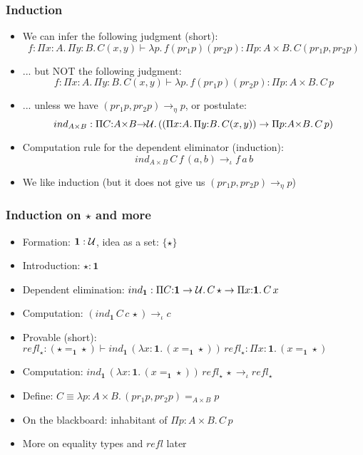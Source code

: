 \documentclass[handout]{beamer}
\newcommand{\depi}[3]{\Pi{#1{:}#2.\,#3}}
\newcommand{\lam}[2]{\lambda{#1.\,#2}}
\newcommand{\lamt}[3]{\lambda{#1{:}#2.\,#3}}
\newcommand{\set}[1]{\{#1\}}
\newcommand{\UU}{{\cal U}}
\newcommand{\bfone}{\mathbf{1}}
\begin{document}
\frame
  {
  
   \frametitle{Induction}

    \begin{itemize}[<+->]
    \item We can infer the following judgment (short):
$$\!\!f:\depi{x}{A}{\depi{y}{B}{C(x,y)}}\vdash{\lam{p}{f(pr_1 p)(pr_2 p)}}: \depi{p}{A{\times}B}{C(pr_1 p,pr_2 p)}$$
    \item ... but NOT the following judgment:
$$f:\depi{x}{A}{\depi{y}{B}{C(x,y)}}\vdash{\lam{p}{f(pr_1 p)(pr_2 p)}}: \depi{p}{A{\times}B}{C\,p}$$
    \item ... unless we have $(pr_1 p,pr_2 p)\to_\eta p$, or postulate:
$$ind_{A{\times}B}:\depi{C}{A{\times}B{\to}\UU}
  {((\depi{x}{A}{\depi{y}{B}{C(x,y)}})\to\depi{p}{A{\times}B}{C\,p})}$$
    \item Computation rule for the {\color{red}dependent eliminator} (induction): 
$$ind_{A{\times}B}\,C\,f\,(a,b)\to_\iota f\,a\,b$$
    \item We like induction (but it does not give us $(pr_1 p,pr_2 p)\to_\eta p$) 
    \end{itemize}
  }

\frame
  {
  
    \frametitle{Induction on $\star$ and more}

    \begin{itemize}[<+->]
    \item Formation: $\bfone:\UU$, idea as a set: $\set{\star}$
    \item Introduction: $\star:\bfone$
    \item Dependent elimination: $ind_{\bfone}:\depi{C}{\bfone\to\UU}{C\,\star \to\depi{x}{\bfone}{C\,x}}$
    \item Computation: $(ind_{\bfone}\,{C}\,c\,\star) \to_\iota c$
    \item Provable (short): $refl_\star : (\star{=}_\bfone\star) \vdash 
          ind_\bfone\,(\lamt{x}{\bfone}{(x{=}_\bfone\star)})\,refl_\star : 
          \depi{x}{\bfone}{(x{=}_\bfone\star)}$
    \item Computation: $ind_\bfone\,(\lamt{x}{\bfone}{(x{=}_\bfone\star)})\,refl_\star\,\star \to_\iota refl_\star$
    \item Define: $C\equiv \lamt{p}{A{\times}B}{(pr_1 p,pr_2 p) =_{A{\times}B} p}$
    \item On the blackboard: inhabitant of $\depi{p}{A{\times}B}{C\,p}$
    \item More on equality types and $refl$ later
    \end{itemize}
  }
\end{document}
